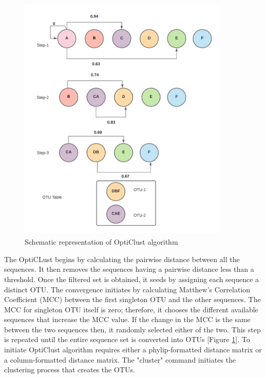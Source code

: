 \begin{figure}[!hb]
  \centering
  \includegraphics[width=10cm, height=12cm]{../figures/Figure5.png}
  \caption{Schematic representation of OptiClust algorithm}
  \label{fig:figure5}
\end{figure}

The OptiCLust begins by calculating the pairwise distance between all the sequences. It then removes the sequences having a pairwise distance less than a threshold. Once the filtered set is obtained, it seeds by assigning each sequence a distinct OTU. The convergence initiates by calculating Matthew's Correlation Coefficient (MCC) between the first singleton OTU and the other sequences. The MCC for singleton OTU itself is zero; therefore, it chooses the different available sequences that increase the MCC value. If the change in the MCC is the same between the two sequences then, it randomly selected either of the two. This step is repeated until the entire sequence set is converted into OTUs [Figure \ref{fig:figure5}]. To initiate OptiClust algorithm requires either a phylip-formatted distance matrix or a column-formatted distance matrix. The "cluster" command initiates the clustering process that creates the OTUs.